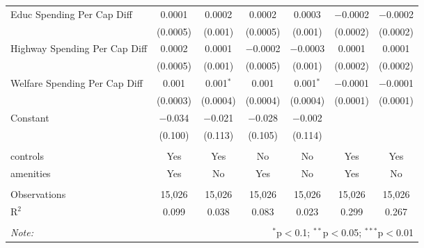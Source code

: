 \begin{table}[!htbp]
\begin{tabular}{@{\extracolsep{5pt}}lcccccc}
  Educ Spending Per Cap Diff & 0.0001 & 0.0002 & 0.0002 & 0.0003 & $-$0.0002 & $-$0.0002 \\ 
  & (0.0005) & (0.001) & (0.0005) & (0.001) & (0.0002) & (0.0002) \\ 
  Highway Spending Per Cap Diff & 0.0002 & 0.0001 & $-$0.0002 & $-$0.0003 & 0.0001 & 0.0001 \\ 
  & (0.0005) & (0.001) & (0.0005) & (0.001) & (0.0002) & (0.0002) \\ 
  Welfare Spending Per Cap Diff & 0.001 & 0.001$^{*}$ & 0.001 & 0.001$^{*}$ & $-$0.0001 & $-$0.0001 \\ 
  & (0.0003) & (0.0004) & (0.0004) & (0.0004) & (0.0001) & (0.0001) \\ 
  Constant & $-$0.034 & $-$0.021 & $-$0.028 & $-$0.002 &  &  \\ 
  & (0.100) & (0.113) & (0.105) & (0.114) &  &  \\ 
 \hline \\[-1.8ex] 
controls & Yes & Yes & No & No & Yes & Yes \\ 
amenities & Yes & No & Yes & No & Yes & No \\ 
\hline \\[-1.8ex] 
Observations & 15,026 & 15,026 & 15,026 & 15,026 & 15,026 & 15,026 \\ 
R$^{2}$ & 0.099 & 0.038 & 0.083 & 0.023 & 0.299 & 0.267 \\ 
\hline 
\hline \\[-1.8ex] 
\textit{Note:}  & \multicolumn{6}{r}{$^{*}$p$<$0.1; $^{**}$p$<$0.05; $^{***}$p$<$0.01} \\ 
\end{tabular} 
\end{table} 
